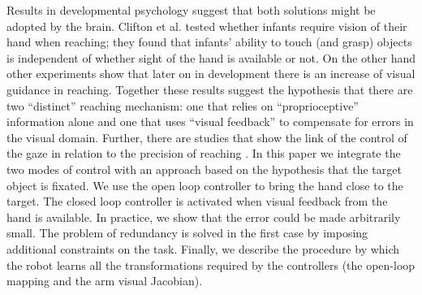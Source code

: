 Results in developmental psychology suggest that both solutions might be
adopted by the brain. Clifton et al. \cite{clifton93isvisually} 
tested whether infants require vision of their hand when reaching; they 
found that infants' ability to touch (and grasp) objects is independent 
of whether sight of the hand is available or not. On the other hand 
other experiments \cite{ashmead93visual} show that later on in development 
there is an increase of visual guidance in reaching. Together these results 
suggest the hypothesis that there are two ``distinct'' reaching mechanism: 
one that relies on ``proprioceptive'' information alone and one that uses 
``visual feedback'' to compensate for errors in the visual domain. Further,
there are studies that show the link of the control of the gaze in relation
to the precision of reaching \cite{flanders-daghestani-berthoz-1999}. 
In this paper we integrate the two modes of control with an approach based on
the hypothesis that the target object is fixated. We use the open loop
controller to bring the hand close to the target. The closed loop controller 
is activated when visual feedback from the hand is available. In practice,
we show that the error could be made arbitrarily small. The problem of 
redundancy is solved in the first case by imposing additional constraints on 
the task. Finally, we describe the procedure by which the robot learns all 
the transformations required by the controllers (the open-loop mapping and 
the arm visual Jacobian).
